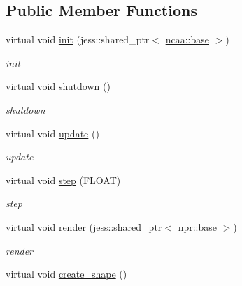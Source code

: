 \subsection*{Public Member Functions}
\begin{DoxyCompactItemize}
\item 
virtual void \hyperlink{classnebula_1_1content_1_1actor_1_1physics_1_1physx_1_1controller_a59f73afb8e716a0b56818e81c577fe26}{init} (jess::shared\_\-ptr$<$ \hyperlink{classnebula_1_1content_1_1actor_1_1admin_1_1base}{ncaa::base} $>$)
\begin{DoxyCompactList}\small\item\em init \item\end{DoxyCompactList}\item 
virtual void \hyperlink{classnebula_1_1content_1_1actor_1_1physics_1_1physx_1_1controller_ad362140ea40ff733f562c37fb7550d14}{shutdown} ()
\begin{DoxyCompactList}\small\item\em shutdown \item\end{DoxyCompactList}\item 
virtual void \hyperlink{classnebula_1_1content_1_1actor_1_1physics_1_1physx_1_1controller_afea1c03aa36b31ee843464c708711ded}{update} ()
\begin{DoxyCompactList}\small\item\em update \item\end{DoxyCompactList}\item 
virtual void \hyperlink{classnebula_1_1content_1_1actor_1_1physics_1_1physx_1_1controller_ab94ef93726ec1cd77c12547149aa8243}{step} (FLOAT)
\begin{DoxyCompactList}\small\item\em step \item\end{DoxyCompactList}\item 
virtual void \hyperlink{classnebula_1_1content_1_1actor_1_1physics_1_1physx_1_1controller_ac47242115c662651bcaa0fbd3c2e87e9}{render} (jess::shared\_\-ptr$<$ \hyperlink{classnebula_1_1platform_1_1renderer_1_1base}{npr::base} $>$)
\begin{DoxyCompactList}\small\item\em render \item\end{DoxyCompactList}\item 
virtual void \hyperlink{classnebula_1_1content_1_1actor_1_1physics_1_1physx_1_1controller_a564978bb4826a13f31d59e474d4cd48e}{create\_\-shape} ()

\end{DoxyCompactItemize}
